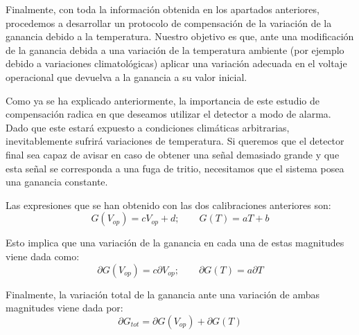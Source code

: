 Finalmente, con toda la información obtenida en los apartados anteriores, procedemos a desarrollar un protocolo de compensación de la variación de la ganancia debido a la temperatura. Nuestro objetivo es que, ante una modificación de la ganancia debida a una variación de la temperatura ambiente (por ejemplo debido a variaciones climatológicas) aplicar una variación adecuada en el voltaje operacional que devuelva a la ganancia a su valor inicial.

Como ya se ha explicado anteriormente, la importancia de este estudio de compensación radica en que deseamos utilizar el detector  a modo de alarma. Dado que este estará expuesto a condiciones climáticas arbitrarias, inevitablemente sufrirá variaciones de temperatura. Si queremos que el detector final sea capaz de avisar en caso de obtener una señal demasiado grande y que esta señal se corresponda a una fuga de tritio, necesitamos que el sistema posea una ganancia constante.

Las expresiones que se han obtenido con las dos calibraciones anteriores son:
\begin{equation}
G(V_{op})=cV_{op}+d; \qquad G(T)=aT+b
\label{gananciatotal}
\end{equation}

Esto implica que una variación de la ganancia en cada una de estas magnitudes viene dada como:
\begin{equation}
\partial G(V_{op}) = c \partial V_{op}; \qquad \partial G(T) = a \partial T
\label{variacionparcialganancia}
\end{equation}

Finalmente, la variación total de la ganancia ante una variación de ambas magnitudes viene dada por:
\begin{equation}
\partial G_{tot} = \partial G(V_{op}) + \partial G(T)
\label{variaciontotalganancia}
\end{equation}


